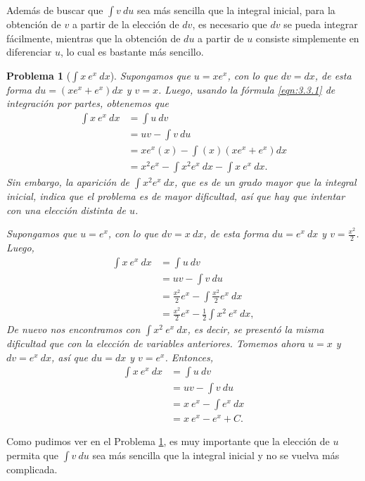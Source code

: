 \documentclass[paper=a4, fontsize=11pt]{scrartcl}
\numberwithin{equation}{subsection}
\numberwithin{figure}{subsection}
\numberwithin{table}{subsection}
\newtheorem{problema}{Problema}
\theoremstyle{definition}
\begin{document}
Además de buscar que $\int v\:du$ sea más sencilla que la integral inicial, para la obtención de $v$ a partir de la elección de $dv$, es necesario que $dv$ se pueda integrar fácilmente, mientras que la obtención de $du$ a partir de $u$ consiste simplemente en diferenciar $u$, lo cual es bastante más sencillo.
\begin{problema}[$\int x\:e^x\:dx$]\label{problema13}
	Supongamos que $u=xe^x$, con lo que $dv=dx$, de esta forma $du=(xe^x+e^x)dx$ y $v=x$. Luego, usando la fórmula \ref{eqn:3.3.1} de integración por partes, obtenemos que
	\begin{align*}
		\int x\:e^x\:dx&=\int u\:dv\\
					&=uv-\int v\:du\\
					&=xe^x(x)-\int (x)(xe^x+e^x)dx\\
					&=x^2e^x-\int x^2e^x\:dx-\int x\:e^x\:dx.
	\end{align*}
	Sin embargo, la aparición de $\int x^2e^x\:dx$, que es de un grado mayor que la integral inicial, indica que el problema es de mayor dificultad, así que hay que intentar con una elección distinta de $u$.
	
	Supongamos que $u=e^x$, con lo que $dv=x\: dx$, de esta forma $du=e^x\:dx$ y $v=\frac{x^2}{2}$. Luego,
	\begin{align*}
		\int x\:e^x\:dx&=\int u\:dv\\
					&=uv-\int v\:du\\
					&=\frac{x^2}{2}e^x-\int \frac{x^2}{2}e^x\:dx\\
					&=\frac{x^2}{2}e^x-\frac{1}{2}\int x^2\:e^x\:dx,
	\end{align*}
	De nuevo nos encontramos con $\int x^2\:e^x\:dx$, es decir, se presentó la misma dificultad que con la elección de variables anteriores. Tomemos ahora $u=x$ y $dv=e^x\:dx$, así que $du=dx$ y $v=e^x$. Entonces,
	\begin{align*}
		\int x\:e^x\:dx&=\int u\:dv\\
					&=uv-\int v\:du\\
					&=x\:e^x-\int e^x\:dx\\
					&=x\:e^x-e^x+C.
	\end{align*}
\end{problema}
Como pudimos ver en el Problema \ref{problema13}, es muy importante que la elección de $u$ permita que $\int v\:du$ sea más sencilla que la integral inicial y no se vuelva más complicada.
\end{document}
